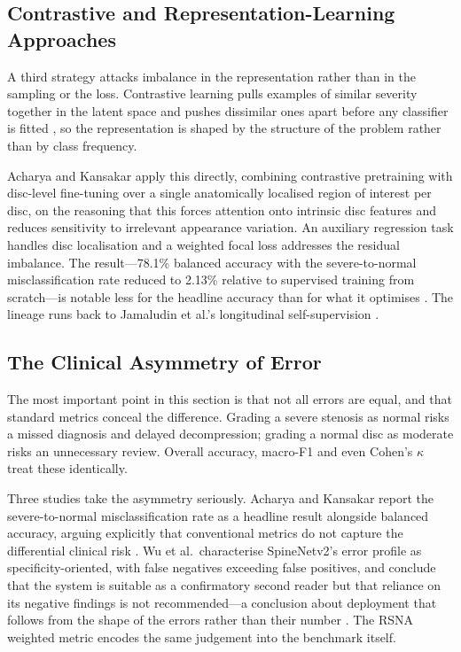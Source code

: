 \subsection{Contrastive and Representation-Learning Approaches}
\label{sec:lr-contrastive}

A third strategy attacks imbalance in the representation rather than in the
sampling or the loss. Contrastive learning pulls examples of similar severity
together in the latent space and pushes dissimilar ones apart before any
classifier is fitted \cite{chen2020simple}, so the representation is shaped by
the structure of the problem rather than by class frequency.

Acharya and Kansakar apply this directly, combining contrastive pretraining with
disc-level fine-tuning over a single anatomically localised region of interest
per disc, on the reasoning that this forces attention onto intrinsic disc
features and reduces sensitivity to irrelevant appearance variation. An auxiliary
regression task handles disc localisation and a weighted focal loss addresses the
residual imbalance. The result---78.1\% balanced accuracy with the
severe-to-normal misclassification rate reduced to 2.13\% relative to supervised
training from scratch---is notable less for the headline accuracy than for what
it optimises \cite{acharya2026disccentric}. The lineage runs back to Jamaludin et
al.'s longitudinal self-supervision \cite{jamaludin2017selfsupervised}.

\subsection{The Clinical Asymmetry of Error}
\label{sec:lr-error-asymmetry}

The most important point in this section is that not all errors are equal, and
that standard metrics conceal the difference. Grading a severe stenosis as
normal risks a missed diagnosis and delayed decompression; grading a normal disc
as moderate risks an unnecessary review. Overall accuracy, macro-F1 and even
Cohen's $\kappa$ treat these identically.

Three studies take the asymmetry seriously. Acharya and Kansakar report the
severe-to-normal misclassification rate as a headline result alongside balanced
accuracy, arguing explicitly that conventional metrics do not capture the
differential clinical risk \cite{acharya2026disccentric}. Wu et al.\ characterise
SpineNetv2's error profile as specificity-oriented, with false negatives
exceeding false positives, and conclude that the system is suitable as a
confirmatory second reader but that reliance on its negative findings is not
recommended---a conclusion about deployment that follows from the shape of the
errors rather than their number \cite{wu2026external}. The RSNA weighted metric
encodes the same judgement into the benchmark itself.

